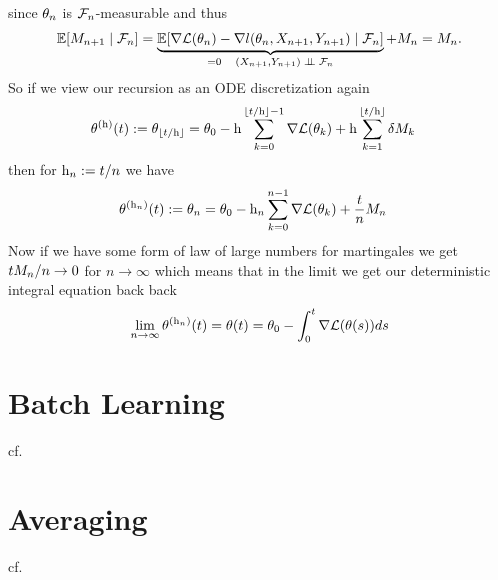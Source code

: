 since \(\theta_n\) is \(\mathcal{F}_n\)-measurable and thus
\begin{align*}
	\mathbb{E}[M_{n+1}\mid \mathcal{F}_n]
	= \underbrace{\mathbb{E}[\nabla\mathcal{L}(\theta_n) - \nabla l(\theta_n, X_{n+1}, Y_{n+1})\mid \mathcal{F}_n]}_{
		=0 \quad (X_{n+1},Y_{n+1}) \mathrel{\;\perp \!\!\! \perp\;} \mathcal{F}_n
	} + M_n
	= M_n.
\end{align*}
%
So if we view our recursion as an ODE discretization again
%
\begin{align*}
	\theta^{(\text{h})}(t) &:= \theta_{\lfloor t/\text{h}\rfloor}
	= \theta_0 - \text{h}\sum_{k=0}^{\lfloor t/\text{h}\rfloor-1}\nabla\mathcal{L}(\theta_k)
	+ \text{h}\sum_{k=1}^{\lfloor t/\text{h}\rfloor}\delta M_k
\end{align*}
%
then for \(\text{h}_n := t/n\) we have
\begin{align*}
	\theta^{(\text{h}_n)}(t) &:= \theta_n
	= \theta_0 - \text{h}_n\sum_{k=0}^{n-1}\nabla\mathcal{L}(\theta_k)
	+\frac{t}{n}M_n
\end{align*}
Now if we have some form of law of large numbers for martingales we get
\(tM_n/n\to 0\) for \(n\to\infty\) which means that in the limit we
get our deterministic integral equation back back
\begin{align*}
	\lim_{n\to\infty}\theta^{(\text{h}_n)}(t) = \theta(t)
	= \theta_0 - \int_0^t \nabla\mathcal{L}(\theta(s))ds
\end{align*}

\textcite{nemirovskiRobustStochasticApproximation2009}
\textcite{simsekliTailIndexAnalysisStochastic2019}

\section{Batch Learning}

cf. \cite{hardtTrainFasterGeneralize2016} \cite{hofferTrainLongerGeneralize2018}

\section{Averaging}

cf. \cite{bachNonstronglyconvexSmoothStochastic2013}


\endinput
